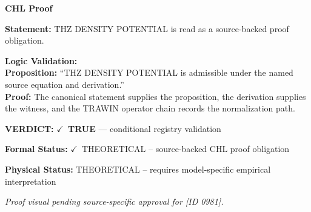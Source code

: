 \vspace{0.45em}
\noindent\textbf{CHL Proof}\par
\textbf{Statement:} THZ DENSITY POTENTIAL is read as a source-backed proof obligation.

\textbf{Logic Validation:}\\
\textbf{Proposition:} ``THZ DENSITY POTENTIAL is admissible under the named source equation and derivation.''\\
\textbf{Proof:} The canonical statement supplies the proposition, the derivation supplies the witness, and the TRAWIN operator chain records the normalization path.

\textbf{VERDICT:} \ensuremath{\checkmark}\ \textbf{TRUE} --- conditional registry validation

\textbf{Formal Status:} \ensuremath{\checkmark}\ THEORETICAL -- source-backed CHL proof obligation

\textbf{Physical Status:} THEORETICAL -- requires model-specific empirical interpretation
\par\vspace{0.45em}
\par
\vfill
\begingroup\footnotesize\itshape
Proof visual pending source-specific approval for [ID 0981].
\par\endgroup
\vfill
\endgroup
\endgroup
